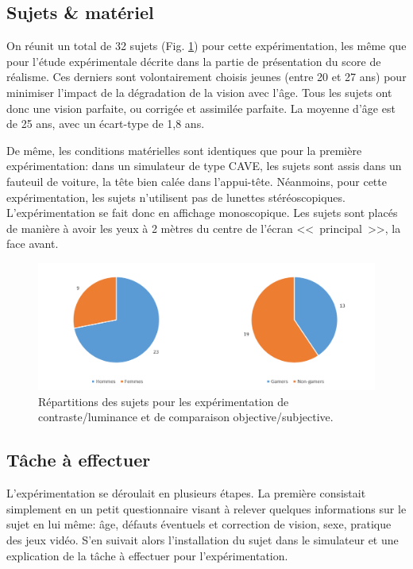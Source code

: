 	\subsection{Sujets \& matériel}
	\par On réunit un total de 32 sujets (Fig. \ref{fig:expe_sujets}) pour cette expérimentation, les même que pour l'étude expérimentale décrite dans la partie de présentation du score de réalisme. Ces derniers sont volontairement choisis jeunes (entre 20 et 27 ans) pour minimiser l'impact de la dégradation de la vision avec l'âge. Tous les sujets ont donc une vision parfaite, ou corrigée et assimilée parfaite. La moyenne d'âge est de 25 ans, avec un écart-type de 1,8 ans.
	
	\par De même, les conditions matérielles sont identiques que pour la première expérimentation: dans un simulateur de type CAVE, les sujets sont assis dans un fauteuil de voiture, la tête bien calée dans l'appui-tête. Néanmoins, pour cette expérimentation, les sujets n'utilisent pas de lunettes stéréoscopiques. L'expérimentation se fait donc en affichage monoscopique. Les sujets sont placés de manière à avoir les yeux à 2 mètres du centre de l'écran <<~principal~>>, la face avant.
	
	\begin{figure}
		\centering
		\includegraphics[scale=0.8]{Figures/SubjectsCharts}
		\caption{Répartitions des sujets pour les expérimentation de contraste/luminance et de comparaison objective/subjective.}
		\label{fig:expe_sujets}
	\end{figure}
	
	\subsection{Tâche à effectuer}
	\par L'expérimentation se déroulait en plusieurs étapes. La première consistait simplement en un petit questionnaire visant à relever quelques informations sur le sujet en lui même: âge, défauts éventuels et correction de vision, sexe, pratique des jeux vidéo. S'en suivait alors l'installation du sujet dans le simulateur et une explication de la tâche à effectuer pour l'expérimentation.
	
